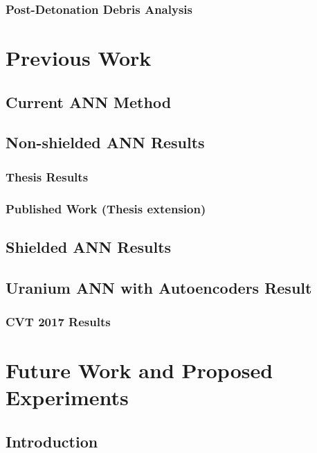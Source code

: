 \documentclass[thesis,tocnosub,noragright,centerchapter,12pt,fullpage]{uiucecethesis09}
\begin{document}
\subsection{Post-Detonation Debris Analysis}


\chapter{Previous Work}

\section{Current ANN Method}


\section{Non-shielded ANN Results}

\subsection{Thesis Results}

\subsection{Published Work (Thesis extension)}


\section{Shielded ANN Results}


\section{Uranium ANN with Autoencoders Result}

\subsection{CVT 2017 Results}




\chapter{Future Work and Proposed Experiments}


\section{Introduction}
\end{document}
